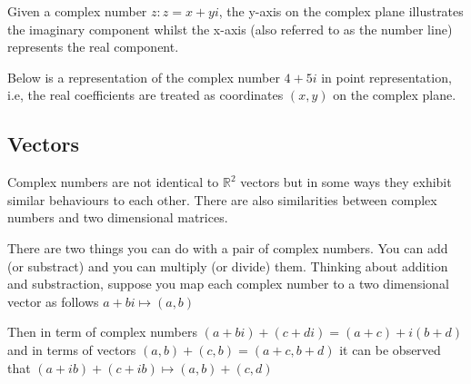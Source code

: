 \documentclass[12pt]{article}
\newcommand{\R}{{\mathbb{R}}}
\begin{document}
    Given a complex number $z: z=x+yi$, the y-axis on the complex plane illustrates
    the imaginary component whilst the x-axis (also referred to as the number line) 
    represents the real component. 

    Below is a representation of the complex number $4 + 5i$ in point representation, i.e, 
    the real coefficients are treated as coordinates $(x, y)$ on the complex plane. 

    \begin{center}
        

    \end{center}

    \subsection{Vectors}

    Complex numbers are not identical to $\R^2$ vectors but in some ways they 
    exhibit similar behaviours to each other. There are also similarities between complex
    numbers and two dimensional matrices. 

    There are two things you can do with a pair of complex numbers. You can add (or substract)
    and you can multiply (or divide) them. Thinking about addition and substraction, suppose 
    you map each complex number to a two dimensional vector as follows $a + bi \mapsto (a, b)$

    Then in term of complex numbers $(a + bi) + (c + di) = (a + c) + i(b + d)$ and in terms of vectors
    $(a, b) + (c, b) = (a + c, b + d)$ it can be observed that $(a + ib) + (c + ib) \mapsto (a, b) + (c, d)$   
\end{document}
